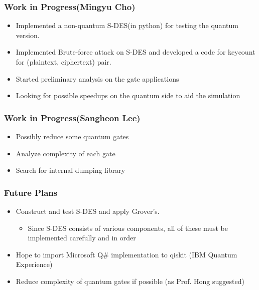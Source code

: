 \documentclass{beamer}
\begin{document}
    \begin{frame}
        \frametitle{Work in Progress(Mingyu Cho)}
        \begin{itemize}
            \item Implemented a non-quantum S-DES(in python) for testing the quantum version.
            \item Implemented Brute-force attack on S-DES and developed a code for keycount for (plaintext, ciphertext) pair.
            \item Started preliminary analysis on the gate applications
            \item Looking for possible speedups on the quantum side to aid the simulation
        \end{itemize}
    \end{frame}

    \begin{frame}
        \frametitle{Work in Progress(Sangheon Lee)}
        \begin{itemize}
            \item Possibly reduce some quantum gates
            \item Analyze complexity of each gate
            \item Search for internal dumping library
        \end{itemize}
    \end{frame}

    \begin{frame}
        \frametitle{Future Plans}
        \begin{itemize}
            \item Construct and test S-DES and apply Grover's.
            \begin{itemize}
                \item Since S-DES consists of various components, all of these must be implemented carefully and in order
            \end{itemize}
            \item Hope to import Microsoft Q\# implementation to qiskit (IBM Quantum Experience)
            \item Reduce complexity of quantum gates if possible (as Prof. Hong suggested)
        \end{itemize}
    \end{frame}
\end{document}
